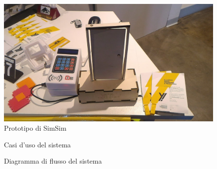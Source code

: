 \documentclass[12pt]{report}
\begin{document}
\begin{figure}[H]
	\includegraphics[width=1\linewidth]{./img/simsim.jpeg}
	\caption{Prototipo di SimSim}
	\label{fig:simsim}
\end{figure}

\begin{figure}[H]
	\caption{Casi d'uso del sistema}
	\label{fig:usecase}
\end{figure}

\begin{figure}[H]
	\caption{Diagramma di flusso del sistema}
	\label{fig:flowchart}
\end{figure}
\end{document}

